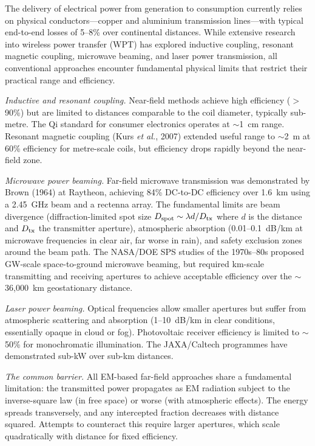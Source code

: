 \documentclass[twocolumn,superscriptaddress,prd]{revtex4-2}
\newcommand{\etal}{\textit{et al.}}
\begin{document}
The delivery of electrical power from generation to consumption currently
relies on physical conductors---copper and aluminium transmission lines---with
typical end-to-end losses of 5--8\% over continental distances. While
extensive research into wireless power transfer (WPT) has explored
inductive coupling, resonant magnetic coupling, microwave beaming, and
laser power transmission, all conventional approaches encounter fundamental
physical limits that restrict their practical range and efficiency.

\textit{Inductive and resonant coupling.} Near-field methods achieve high
efficiency ($>$90\%) but are limited to distances comparable to the coil
diameter, typically sub-metre. The Qi standard for consumer electronics
operates at $\sim$1~cm range. Resonant magnetic coupling (Kurs \etal,
2007) extended useful range to $\sim$2~m at 60\% efficiency for
metre-scale coils, but efficiency drops rapidly beyond the near-field zone.

\textit{Microwave power beaming.} Far-field microwave transmission was
demonstrated by Brown (1964) at Raytheon, achieving 84\% DC-to-DC
efficiency over 1.6~km using a 2.45~GHz beam and a rectenna array. The
fundamental limits are beam divergence (diffraction-limited spot size
$D_{\rm spot} \sim \lambda d / D_{\rm tx}$ where $d$ is the distance and
$D_{\rm tx}$ the transmitter aperture), atmospheric absorption (0.01--0.1~dB/km
at microwave frequencies in clear air, far worse in rain), and safety
exclusion zones around the beam path. The NASA/DOE SPS studies of the
1970s--80s proposed GW-scale space-to-ground microwave beaming, but
required km-scale transmitting and receiving apertures to achieve acceptable
efficiency over the $\sim$36,000~km geostationary distance.

\textit{Laser power beaming.} Optical frequencies allow smaller apertures
but suffer from atmospheric scattering and absorption (1--10~dB/km in
clear conditions, essentially opaque in cloud or fog). Photovoltaic
receiver efficiency is limited to $\sim$50\% for monochromatic illumination.
The JAXA/Caltech programmes have demonstrated sub-kW over sub-km distances.

\textit{The common barrier.} All EM-based far-field approaches share a
fundamental limitation: the transmitted power propagates as EM radiation
subject to the inverse-square law (in free space) or worse (with
atmospheric effects). The energy spreads transversely, and any intercepted
fraction decreases with distance squared. Attempts to counteract this
require larger apertures, which scale quadratically with distance for
fixed efficiency.
\end{document}
